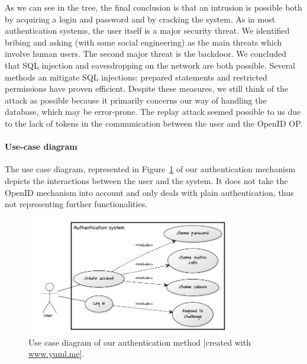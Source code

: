 \documentclass[11pt,a4paper]{article}
\begin{document}
As we can see in the tree, the final conclusion is that an intrusion is possible both by acquiring a login and password and by cracking the system. As in most authentication systems, the user itself is a major security threat. We identified bribing and asking (with some social engineering) as the main threats which involve human users. The second major threat is the backdoor.
We concluded that SQL injection and eavesdropping on the network are both possible. Several methods an mitigate SQL injections: prepared statements and restricted permissions have proven efficient. Despite these measures, we still think of the attack as possible because it primarily concerns our way of handling the database, which may be error-prone.
The replay attack seemed possible to us due to the lack of tokens in the communication between the user and the OpenID OP.


\paragraph{Use-case diagram} The use case diagram, represented in Figure~\ref{fig:usecasedia} of our authentication mechanism depicts the interactions between the user and the system. It does not take the OpenID mechanism into account and only deals with plain authentication, thus not representing further functionalities.
\begin{figure}
\centering
\includegraphics[width=0.8\textwidth]{usecasedia.png}
\caption{Use case diagram of our authentication method [created with \url{www.yuml.me}].}
\label{fig:usecasedia}
\end{figure}
\end{document}
